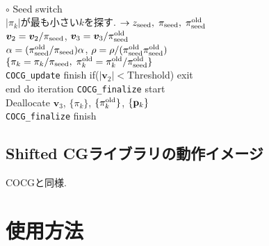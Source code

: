 \documentclass[12pt,titlepage]{jarticle}
\renewenvironment{leftbar}{%
  \def\FrameCommand{\vrule width 1pt \hspace{0pt}}%
  \MakeFramed {\advance\hsize-\width \FrameRestore}}%
 {\endMakeFramed}
\begin{document}
\begin{leftbar}
  \\\hspace{1.0cm}
  $\circ$ Seed switch
  \\\hspace{1.0cm}
  $|\pi_k|$が最も小さい$k$を探す. 
  $\rightarrow z_{\rm seed},\; \pi_{\rm seed},\; \pi_{\rm seed}^{\rm old} $
  \\\hspace{1.0cm}
  ${\boldsymbol v}_2 = {\boldsymbol v}_2 / \pi_{\rm seed}$,
  ${\boldsymbol v}_3 = {\boldsymbol v}_3 / \pi_{\rm seed}^{\rm old}$
  \\\hspace{1.0cm}
  $\alpha = (\pi_{\rm seed}^{\rm old} / \pi_{\rm seed}) \alpha$,
  $\rho = \rho / (\pi_{\rm seed}^{\rm old} \pi_{\rm seed}^{\rm old})$
  \\\hspace{1.0cm}
  $\{\pi_k = \pi_k / \pi_{\rm seed},\; \pi_k^{\rm old} = \pi_k^{\rm old} / \pi_{\rm seed}^{\rm old}\}$
  \\\hspace{0.5cm}
  \verb|COCG_update| finish
\end{leftbar}
\vspace{-1em}
\noindent
\hspace{0.5cm}
if($|{\boldsymbol v}_2| < $Threshold) exit
\\
end do iteration
\vspace{-1em}
\begin{leftbar}
  \noindent
  \verb|COCG_finalize| start
  \\ \hspace{0.5cm}
  Deallocate ${\boldsymbol v}_3$, $\{\pi_k\}$, $\{\pi_k^{\rm old}\}$, $\{{\bf p}_k\}$
  \\
  \verb|COCG_finalize| finish
\end{leftbar}
\vspace{-1em}

\subsection{Shifted CGライブラリの動作イメージ}

COCGと同様.

\section{使用方法}
\end{document}
